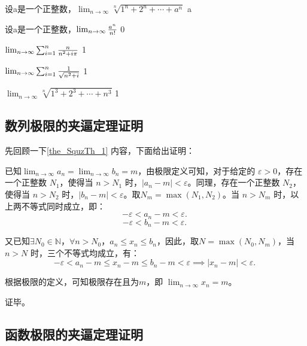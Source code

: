 \begin{example}{设a是一个正整数，$\lim_{n\to\infty}\sqrt[n]{1^n+2^n+\cdots+a^n}$}
a
\end{example}
\begin{example}{设a是一个正整数，$\lim_{n\to\infty}{a^n\over n!}$}
0
\end{example}
\begin{example}{$\lim_{n\to\infty}\sum_{i=1}^n{n\over n^2+i\pi}$}
1
\end{example}
\begin{example}{$\lim_{n\to\infty}\sum_{i=1}^n{1\over\sqrt{n^2+i}}$}
1
\end{example}

\begin{example}{$\lim_{n\to\infty}\sqrt[n]{1^3+2^3+\cdots+n^3}$}
1
\end{example}
\subsection{数列极限的夹逼定理证明}

先回顾一下\autoref{the_SquzTh_1} 内容，下面给出证明：

已知$\lim_{n \to \infty} a_n = \lim_{n \to \infty} b_n = m$，由极限定义可知，对于给定的 $\varepsilon > 0$，存在一个正整数 $N_1$，使得当 $n > N_1$ 时，$|a_n - m| < \varepsilon$。同理，存在一个正整数 $N_2$，使得当 $n > N_2$ 时，$|b_n - m| < \varepsilon$。取$N_m = \max(N_1, N_2)$。当 $n > N_m$ 时，以上两不等式同时成立，即：
\begin{equation}
- \varepsilon < a_n-m <\varepsilon.~
\end{equation}
\begin{equation}
-\varepsilon < b_n-m <\varepsilon.~
\end{equation}

又已知$\exists N_0\in \mathbb{N}$，$\forall n>N_0$，$a_n\leq x_n\leq b_n$，因此，取$N=\max(N_0, N_m)$，当 $n > N$ 时，三个不等式均成立，有：
\begin{equation}
- \varepsilon < a_n-m \leq x_n-m \leq b_n-m <\varepsilon\implies |x_n-m|<\varepsilon.~
\end{equation}

根据极限的定义，可知极限存在且为$m$，即 $\lim_{n \to \infty} x_n = m$。

证毕。


\subsection{函数极限的夹逼定理证明}



